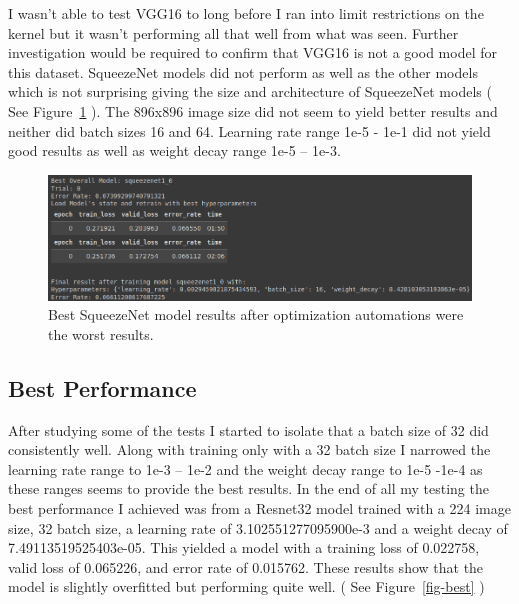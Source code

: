 \documentclass[
  letterpaper,
  DIV=11,
  numbers=noendperiod]{scrartcl}
\begin{document}
I wasn't able to test VGG16 to long before I ran into limit restrictions
on the kernel but it wasn't performing all that well from what was seen.
Further investigation would be required to confirm that VGG16 is not a
good model for this dataset. SqueezeNet models did not perform as well
as the other models which is not surprising giving the size and
architecture of SqueezeNet models ( See Figure~\ref{fig-worst} ). The
896x896 image size did not seem to yield better results and neither did
batch sizes 16 and 64. Learning rate range 1e-5 - 1e-1 did not yield
good results as well as weight decay range 1e-5 -- 1e-3.

\begin{figure}

{\centering \includegraphics{squeezenetresults.png}

}

\caption{\label{fig-worst}Best SqueezeNet model results after
optimization automations were the worst results.}

\end{figure}

\hypertarget{best-performance}{%
\subsection{Best Performance}\label{best-performance}}

After studying some of the tests I started to isolate that a batch size
of 32 did consistently well. Along with training only with a 32 batch
size I narrowed the learning rate range to 1e-3 -- 1e-2 and the weight
decay range to 1e-5 -1e-4 as these ranges seems to provide the best
results. In the end of all my testing the best performance I achieved
was from a Resnet32 model trained with a 224 image size, 32 batch size,
a learning rate of 3.102551277095900e-3 and a weight decay of
7.49113519525403e-05. This yielded a model with a training loss of
0.022758, valid loss of 0.065226, and error rate of 0.015762. These
results show that the model is slightly overfitted but performing quite
well. ( See Figure~\ref{fig-best} )
\end{document}
